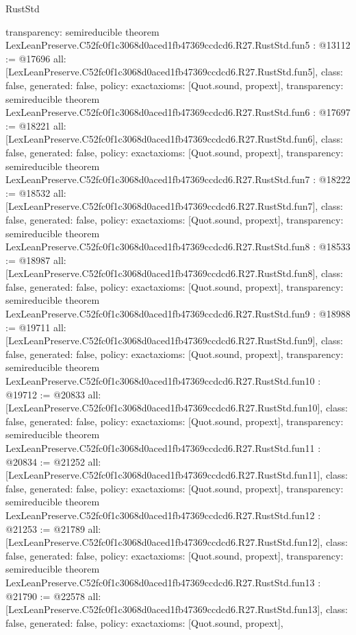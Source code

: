 \begin{lexlean}{RustStd}
\begin{coremodule}
{  transparency: semireducible
}
theorem LexLeanPreserve.C52fc0f1c3068d0aced1fb47369ccdcd6.R27.RustStd.fun5 : @13112 := @17696 {
  all: [LexLeanPreserve.C52fc0f1c3068d0aced1fb47369ccdcd6.R27.RustStd.fun5],
  class: false,
  generated: false,
  policy: exact{axioms: [Quot.sound, propext]},
  transparency: semireducible
}
theorem LexLeanPreserve.C52fc0f1c3068d0aced1fb47369ccdcd6.R27.RustStd.fun6 : @17697 := @18221 {
  all: [LexLeanPreserve.C52fc0f1c3068d0aced1fb47369ccdcd6.R27.RustStd.fun6],
  class: false,
  generated: false,
  policy: exact{axioms: [Quot.sound, propext]},
  transparency: semireducible
}
theorem LexLeanPreserve.C52fc0f1c3068d0aced1fb47369ccdcd6.R27.RustStd.fun7 : @18222 := @18532 {
  all: [LexLeanPreserve.C52fc0f1c3068d0aced1fb47369ccdcd6.R27.RustStd.fun7],
  class: false,
  generated: false,
  policy: exact{axioms: [Quot.sound, propext]},
  transparency: semireducible
}
theorem LexLeanPreserve.C52fc0f1c3068d0aced1fb47369ccdcd6.R27.RustStd.fun8 : @18533 := @18987 {
  all: [LexLeanPreserve.C52fc0f1c3068d0aced1fb47369ccdcd6.R27.RustStd.fun8],
  class: false,
  generated: false,
  policy: exact{axioms: [Quot.sound, propext]},
  transparency: semireducible
}
theorem LexLeanPreserve.C52fc0f1c3068d0aced1fb47369ccdcd6.R27.RustStd.fun9 : @18988 := @19711 {
  all: [LexLeanPreserve.C52fc0f1c3068d0aced1fb47369ccdcd6.R27.RustStd.fun9],
  class: false,
  generated: false,
  policy: exact{axioms: [Quot.sound, propext]},
  transparency: semireducible
}
theorem LexLeanPreserve.C52fc0f1c3068d0aced1fb47369ccdcd6.R27.RustStd.fun10 : @19712 := @20833 {
  all: [LexLeanPreserve.C52fc0f1c3068d0aced1fb47369ccdcd6.R27.RustStd.fun10],
  class: false,
  generated: false,
  policy: exact{axioms: [Quot.sound, propext]},
  transparency: semireducible
}
theorem LexLeanPreserve.C52fc0f1c3068d0aced1fb47369ccdcd6.R27.RustStd.fun11 : @20834 := @21252 {
  all: [LexLeanPreserve.C52fc0f1c3068d0aced1fb47369ccdcd6.R27.RustStd.fun11],
  class: false,
  generated: false,
  policy: exact{axioms: [Quot.sound, propext]},
  transparency: semireducible
}
theorem LexLeanPreserve.C52fc0f1c3068d0aced1fb47369ccdcd6.R27.RustStd.fun12 : @21253 := @21789 {
  all: [LexLeanPreserve.C52fc0f1c3068d0aced1fb47369ccdcd6.R27.RustStd.fun12],
  class: false,
  generated: false,
  policy: exact{axioms: [Quot.sound, propext]},
  transparency: semireducible
}
theorem LexLeanPreserve.C52fc0f1c3068d0aced1fb47369ccdcd6.R27.RustStd.fun13 : @21790 := @22578 {
  all: [LexLeanPreserve.C52fc0f1c3068d0aced1fb47369ccdcd6.R27.RustStd.fun13],
  class: false,
  generated: false,
  policy: exact{axioms: [Quot.sound, propext]},
}
\end{coremodule}
\end{lexlean}
